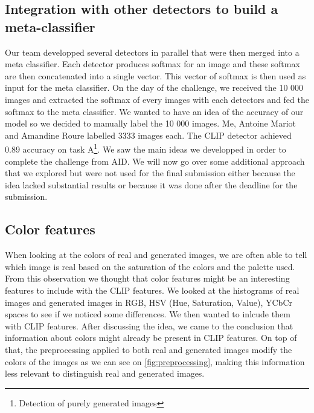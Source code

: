 \documentclass[12pt,a4paper]{article}
\begin{document}
\subsection{Integration with other detectors to build a meta-classifier}
Our team developped several detectors in parallel that were then merged into a meta classifier. Each detector produces softmax for an image and these softmax are then concatenated into a single vector. This vector of softmax is then used as input for the meta classifier. On the day of the challenge, we received the 10 000 images and extracted the softmax of every images with each detectors and fed the softmax to the meta classifier. We wanted to have an idea of the accuracy of our model so we decided to manually label the 10 000 images. Me, Antoine Mariot and Amandine Roure labelled 3333 images each. The CLIP detector achieved 0.89 accuracy on task A\footnote{Detection of purely generated images}. We saw the main ideas we developped in order to complete the challenge from AID. We will now go over some additional approach that we explored but were not used for the final submission either because the idea lacked substantial results or because it was done after the deadline for the submission.

\subsection{Color features}
When looking at the colors of real and generated images, we are often able to tell which image is real based on the saturation of the colors and the palette used. From this observation we thought that color features might be an interesting features to include with the CLIP features. We looked at the histograms of real images and generated images in RGB, HSV (Hue, Saturation, Value), YCbCr spaces to see if we noticed some differences. We then wanted to inlcude them with CLIP features. After discussing the idea, we came to the conclusion that information about colors might already be present in CLIP features. On top of that, the preprocessing applied to both real and generated images modify the colors  of the images as we can see on \autoref*{fig:preprocessing}, making this information less relevant to distinguish real and generated images.
\end{document}
